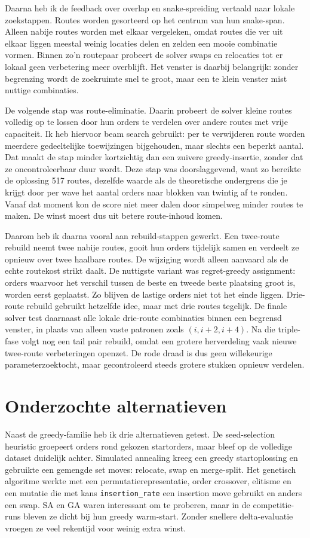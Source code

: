 \documentclass[a4paper,11pt]{article}
\begin{document}
Daarna heb ik de feedback over overlap en snake-spreiding vertaald naar lokale zoekstappen. Routes worden gesorteerd op het centrum van hun snake-span. Alleen nabije routes worden met elkaar vergeleken, omdat routes die ver uit elkaar liggen meestal weinig locaties delen en zelden een mooie combinatie vormen. Binnen zo'n routepaar probeert de solver swaps en relocaties tot er lokaal geen verbetering meer overblijft. Het venster is daarbij belangrijk: zonder begrenzing wordt de zoekruimte snel te groot, maar een te klein venster mist nuttige combinaties.

De volgende stap was route-eliminatie. Daarin probeert de solver kleine routes volledig op te lossen door hun orders te verdelen over andere routes met vrije capaciteit. Ik heb hiervoor beam search gebruikt: per te verwijderen route worden meerdere gedeeltelijke toewijzingen bijgehouden, maar slechts een beperkt aantal. Dat maakt de stap minder kortzichtig dan een zuivere greedy-insertie, zonder dat ze oncontroleerbaar duur wordt. Deze stap was doorslaggevend, want zo bereikte de oplossing 517 routes, dezelfde waarde als de theoretische ondergrens die je krijgt door per wave het aantal orders naar blokken van twintig af te ronden. Vanaf dat moment kon de score niet meer dalen door simpelweg minder routes te maken. De winst moest dus uit betere route-inhoud komen.

Daarom heb ik daarna vooral aan rebuild-stappen gewerkt. Een twee-route rebuild neemt twee nabije routes, gooit hun orders tijdelijk samen en verdeelt ze opnieuw over twee haalbare routes. De wijziging wordt alleen aanvaard als de echte routekost strikt daalt. De nuttigste variant was regret-greedy assignment: orders waarvoor het verschil tussen de beste en tweede beste plaatsing groot is, worden eerst geplaatst. Zo blijven de lastige orders niet tot het einde liggen. Drie-route rebuild gebruikt hetzelfde idee, maar met drie routes tegelijk. De finale solver test daarnaast alle lokale drie-route combinaties binnen een begrensd venster, in plaats van alleen vaste patronen zoals $(i,i+2,i+4)$. Na die triple-fase volgt nog een tail pair rebuild, omdat een grotere herverdeling vaak nieuwe twee-route verbeteringen openzet. De rode draad is dus geen willekeurige parameterzoektocht, maar gecontroleerd steeds grotere stukken opnieuw verdelen.

\section{Onderzochte alternatieven}
Naast de greedy-familie heb ik drie alternatieven getest. De seed-selection heuristic groepeert orders rond gekozen startorders, maar bleef op de volledige dataset duidelijk achter. Simulated annealing kreeg een greedy startoplossing en gebruikte een gemengde set moves: relocate, swap en merge-split. Het genetisch algoritme werkte met een permutatierepresentatie, order crossover, elitisme en een mutatie die met kans \texttt{insertion\_rate} een insertion move gebruikt en anders een swap. SA en GA waren interessant om te proberen, maar in de competitie-runs bleven ze dicht bij hun greedy warm-start. Zonder snellere delta-evaluatie vroegen ze veel rekentijd voor weinig extra winst.
\end{document}
